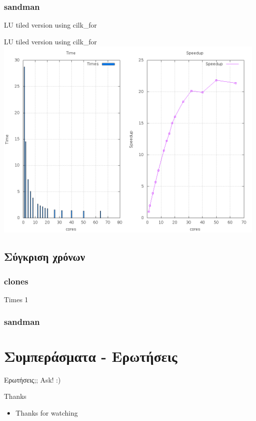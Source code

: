 \documentclass{beamer}
\begin{document}
\subsubsection{sandman}
\begin{frame}{LU tiled version using cilk\_for}
    \begin{block}{LU tiled version using cilk\_for}
        \centering
        \includegraphics[scale=0.25]{files/sandman_tiled_cilk_for.png}
    \end{block}
\end{frame}

\subsection{Σύγκριση χρόνων}
\subsubsection{clones}
\begin{frame}
    Times 1
\end{frame}
\subsubsection{sandman}


\section{Συμπεράσματα - Ερωτήσεις}

\begin{frame}{Ερωτήσεις;;}
    Ask! :)
\end{frame}

\begin{frame}[fragile]{Thanks}
    \begin{itemize}
        \item Thanks for watching
    \end{itemize}
\end{frame}
\end{document}
